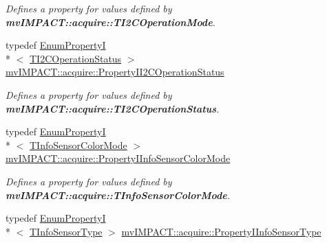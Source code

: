 \begin{DoxyCompactItemize}
\begin{DoxyCompactList}\small\item\em Defines a property for values defined by {\bfseries mv\+I\+M\+P\+A\+C\+T\+::acquire\+::\+T\+I2\+C\+Operation\+Mode}. \end{DoxyCompactList}\item 
\hypertarget{group___device_specific_interface_ga4e0a176291dd65f15a0fddf3c1d552a1}{typedef \hyperlink{classmv_i_m_p_a_c_t_1_1acquire_1_1_enum_property_i}{Enum\+Property\+I}\\*
$<$ \hyperlink{group___device_specific_interface_ga141afcf1d25294043818cb39a26914af}{T\+I2\+C\+Operation\+Status} $>$ \hyperlink{group___device_specific_interface_ga4e0a176291dd65f15a0fddf3c1d552a1}{mv\+I\+M\+P\+A\+C\+T\+::acquire\+::\+Property\+I\+I2\+C\+Operation\+Status}}\label{group___device_specific_interface_ga4e0a176291dd65f15a0fddf3c1d552a1}

\begin{DoxyCompactList}\small\item\em Defines a property for values defined by {\bfseries mv\+I\+M\+P\+A\+C\+T\+::acquire\+::\+T\+I2\+C\+Operation\+Status}. \end{DoxyCompactList}\item 
\hypertarget{group___device_specific_interface_gaf05019cc6b863ccf692d8705e7ae6c57}{typedef \hyperlink{classmv_i_m_p_a_c_t_1_1acquire_1_1_enum_property_i}{Enum\+Property\+I}\\*
$<$ \hyperlink{group___device_specific_interface_ga45dccb9c972f4e6cb713da77a694c1e6}{T\+Info\+Sensor\+Color\+Mode} $>$ \hyperlink{group___device_specific_interface_gaf05019cc6b863ccf692d8705e7ae6c57}{mv\+I\+M\+P\+A\+C\+T\+::acquire\+::\+Property\+I\+Info\+Sensor\+Color\+Mode}}\label{group___device_specific_interface_gaf05019cc6b863ccf692d8705e7ae6c57}

\begin{DoxyCompactList}\small\item\em Defines a property for values defined by {\bfseries mv\+I\+M\+P\+A\+C\+T\+::acquire\+::\+T\+Info\+Sensor\+Color\+Mode}. \end{DoxyCompactList}\item 
\hypertarget{group___device_specific_interface_ga071d509608754cf5b0d258cc0ac39726}{typedef \hyperlink{classmv_i_m_p_a_c_t_1_1acquire_1_1_enum_property_i}{Enum\+Property\+I}\\*
$<$ \hyperlink{group___device_specific_interface_gaa1c7fc61c4ab1828d517f3b15909a1a5}{T\+Info\+Sensor\+Type} $>$ \hyperlink{group___device_specific_interface_ga071d509608754cf5b0d258cc0ac39726}{mv\+I\+M\+P\+A\+C\+T\+::acquire\+::\+Property\+I\+Info\+Sensor\+Type}}\label{group___device_specific_interface_ga071d509608754cf5b0d258cc0ac39726}


\end{DoxyCompactItemize}
